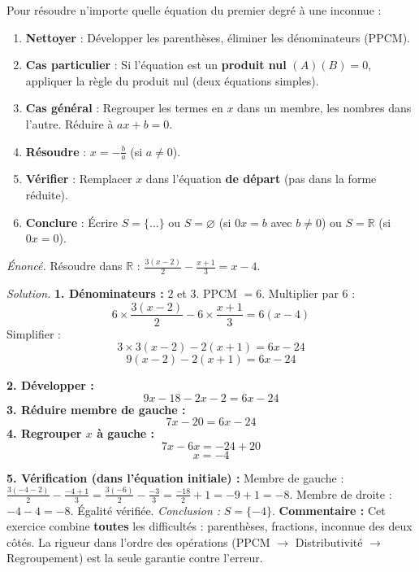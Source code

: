 \documentclass[11pt]{article}
\begin{document}
\begin{aretenir}
\leavevmode
Pour résoudre n'importe quelle équation du premier degré à une inconnue :
\begin{enumerate}
    \item \textbf{Nettoyer} : Développer les parenthèses, éliminer les dénominateurs (PPCM).
    \item \textbf{Cas particulier} : Si l'équation est un \textbf{produit nul} $(A)(B)=0$, appliquer la règle du produit nul (deux équations simples).
    \item \textbf{Cas général} : Regrouper les termes en $x$ dans un membre, les nombres dans l'autre. Réduire à $ax+b=0$.
    \item \textbf{Résoudre} : $x = -\frac{b}{a}$ (si $a \neq 0$).
    \item \textbf{Vérifier} : Remplacer $x$ dans l'équation \textbf{de départ} (pas dans la forme réduite).
    \item \textbf{Conclure} : Écrire $S = \{ \dots \}$ ou $S = \varnothing$ (si $0x = b$ avec $b \neq 0$) ou $S = \mathbb{R}$ (si $0x = 0$).
\end{enumerate}
\end{aretenir}

\begin{exoresolu}[Synthèse : $\frac{3(x-2)}{2} - \frac{x+1}{3} = x - 4$]
\emph{Énoncé.} Résoudre dans $\mathbb{R}$ : $\frac{3(x-2)}{2} - \frac{x+1}{3} = x - 4$.

\emph{Solution.}
\textbf{1. Dénominateurs :} $2$ et $3$. PPCM $= 6$.
Multiplier par $6$ :
\[ 6 \times \frac{3(x-2)}{2} - 6 \times \frac{x+1}{3} = 6(x - 4) \]
Simplifier :
\[ 3 \times 3(x-2) - 2(x+1) = 6x - 24 \]
\[ 9(x-2) - 2(x+1) = 6x - 24 \]

\textbf{2. Développer :}
\[ 9x - 18 - 2x - 2 = 6x - 24 \]
\textbf{3. Réduire membre de gauche :}
\[ 7x - 20 = 6x - 24 \]
\textbf{4. Regrouper $x$ à gauche :}
\[ 7x - 6x = -24 + 20 \]
\[ x = -4 \]

\textbf{5. Vérification (dans l'équation initiale) :}
Membre de gauche : $\frac{3(-4-2)}{2} - \frac{-4+1}{3} = \frac{3(-6)}{2} - \frac{-3}{3} = \frac{-18}{2} + 1 = -9 + 1 = -8$.
Membre de droite : $-4 - 4 = -8$.
Égalité vérifiée.
\emph{Conclusion :} $S = \{-4\}$.
\tcblower
\textbf{Commentaire :} Cet exercice combine \textbf{toutes} les difficultés : parenthèses, fractions, inconnue des deux côtés. La rigueur dans l'ordre des opérations (PPCM $\rightarrow$ Distributivité $\rightarrow$ Regroupement) est la seule garantie contre l'erreur.
\end{exoresolu}
\end{document}
